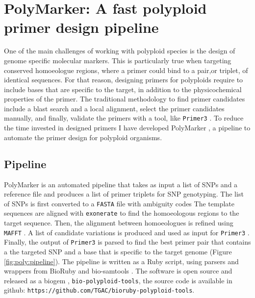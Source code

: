 
\chapter{PolyMarker: A fast polyploid primer design pipeline}
One of the main challenges of working with polyploid species is the design of genome specific molecular markers. 
This is particularly true when targeting conserved homoeologue regions, where a primer could bind to a pair,or triplet, of identical sequences. 
For that reason, designing primers for polyploids require to include bases that are specific to the target, in addition to the physicochemical properties of the primer.  
The traditional methodology to find primer candidates include a blast search and a local alignment, select the primer candidates manually, and finally, validate the primers with a tool, like \texttt{Primer3} \citep{Rozen}. 
To reduce the time invested in designed primers I have developed PolyMarker \citep{Ramirez-Gonzalez2015a}, a pipeline to automate the primer design for polyploid organisms.  

\section{Pipeline}
PolyMarker is an automated pipeline that takes as input a list of SNPs and a reference file and produces a list of primer triplets for SNP genotyping. 
The list of SNPs is first converted to a \texttt{FASTA} file with ambiguity codes \citep{Cornish-Bowden1985} 
The template sequences are aligned with \texttt{exonerate} \citep{Slater2005}  to find the homoeologous regions to the target sequence. 
Then, the alignment between homoeologues is refined using \texttt{MAFFT} \citep{Katoh2013}. 
A list of candidate variations is produced and used as input for \texttt{Primer3} \citep{Rozen}. 
Finally, the output of \texttt{Primer3} is parsed to find the best primer pair that contains a the targeted SNP and a base that is specific to the target genome (Figure \ref{fig:poly:pipeline}).  
The pipeline is written as a Ruby script, using parsers and wrappers from BioRuby \citep{Goto2010} and bio-samtools \citep{Etherington2015,Ramirez-Gonzalez2012}. 
The software is open source and released as a biogem \citep{Bonnal2012}, \texttt{bio-polyploid-tools}, the source code is available in github: \texttt{https://github.com/TGAC/bioruby-polyploid-tools}.


